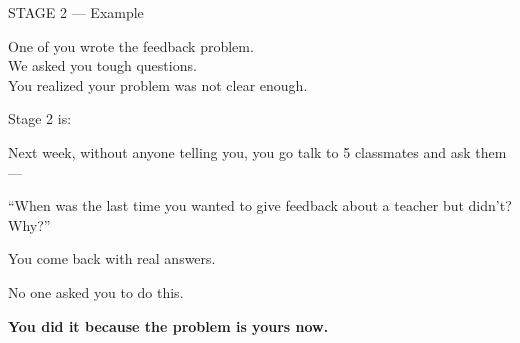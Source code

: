 \documentclass[aspectratio=169]{beamer}
\begin{document}
{
\begin{frame}{}
\vfill
\begin{center}
{\color{stage}\normalsize STAGE 2 --- Example\par}
\vspace{16pt}
\begin{minipage}{0.82\textwidth}
{\color{darktext}One of you wrote the feedback problem.\\We asked you tough questions.\\You realized your problem was not clear enough.\par}
\vspace{14pt}
{\color{accent}Stage 2 is:\par}
\vspace{8pt}
{\color{darktext}Next week, without anyone telling you, you go talk to 5 classmates and ask them---\par}
\vspace{6pt}
{\large\color{accent}``When was the last time you wanted to give feedback about a teacher but didn't? Why?''\par}
\vspace{14pt}
{\color{darktext}You come back with real answers.\par}
\vspace{4pt}
{\color{dimtext}No one asked you to do this.\par}
\vspace{4pt}
{\color{accent}\bfseries You did it because the problem is yours now.\par}
\end{minipage}
\end{center}
\vfill
\end{frame}
}
\end{document}
